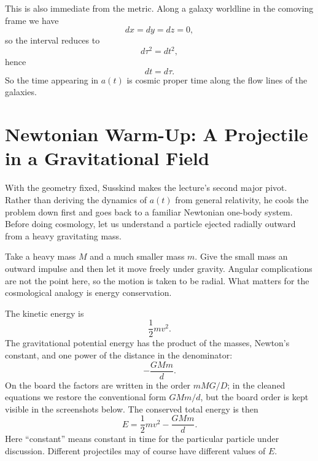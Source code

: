 This is also immediate from the metric. Along a galaxy worldline in the comoving frame we have
\begin{equation}
dx=dy=dz=0,
\end{equation}
so the interval reduces to
\begin{equation}
d\tau^2=dt^2,
\end{equation}
hence
\begin{equation}
dt=d\tau.
\end{equation}
So the time appearing in \(a(t)\) is cosmic proper time along the flow lines of the galaxies.

\section{Newtonian Warm-Up: A Projectile in a Gravitational Field}

With the geometry fixed, Susskind makes the lecture's second major pivot. Rather than deriving the dynamics of \(a(t)\) from general relativity, he cools the problem down first and goes back to a familiar Newtonian one-body system. Before doing cosmology, let us understand a particle ejected radially outward from a heavy gravitating mass.

Take a heavy mass \(M\) and a much smaller mass \(m\). Give the small mass an outward impulse and then let it move freely under gravity. Angular complications are not the point here, so the motion is taken to be radial. What matters for the cosmological analogy is energy conservation.

The kinetic energy is
\begin{equation}
\frac{1}{2}mv^2.
\end{equation}
The gravitational potential energy has the product of the masses, Newton's constant, and one power of the distance in the denominator:
\begin{equation}
-\frac{GMm}{d}.
\end{equation}
On the board the factors are written in the order \(mMG/D\); in the cleaned equations we restore the conventional form \(GMm/d\), but the board order is kept visible in the screenshots below. The conserved total energy is then
\begin{equation}
E=\frac{1}{2}mv^2-\frac{GMm}{d}.
\end{equation}
Here ``constant'' means constant in time for the particular particle under discussion. Different projectiles may of course have different values of \(E\).

